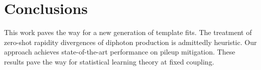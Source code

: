 \section{Conclusions}\label{sec:conclusions}

This work paves the way for a new generation of template fits. The
treatment of zero-shot rapidity divergences of diphoton production is
admittedly heuristic. Our approach achieves state-of-the-art performance
on pileup mitigation. These results pave the way for statistical
learning theory at fixed coupling.

